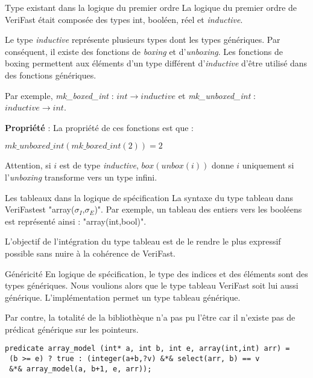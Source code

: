 \documentclass[9pt]{beamer}
\newcommand{\verifast}{VeriFast}
\newcommand{\inductive}{\textit{inductive}}
\begin{document}
\begin{frame}{Type existant dans la logique du premier ordre}
La logique du premier ordre de \verifast{} \'etait compos\'ee des types int, bool\'een, r\'eel et \inductive.

Le type \inductive{} repr\'esente plusieurs types dont les types g\'en\'eriques. Par cons\'equent, il existe des fonctions de \textit{boxing} et d'\textit{unboxing}. Les fonctions de boxing permettent aux \'el\'ements d'un type diff\'erent d'\inductive{} d'\^etre utilis\'e dans des fonctions g\'en\'eriques.

Par exemple, \textit{mk_boxed_int} : $int \rightarrow inductive$ et \textit{mk_unboxed_int} :  $inductive \rightarrow int$.

\textbf{Propri\'et\'e} : La propri\'et\'e de ces fonctions est que :
	\begin{center}
		$mk\_unboxed\_int(mk\_boxed\_int(2)) = 2$
	\end{center}
	Attention, si $i$ est de type \textit{inductive}, $box(unbox(i))$ donne $i$ uniquement si l'\textit{unboxing} transforme vers un type infini.
\end{frame}

\begin{frame}{Les tableaux dans la logique de sp\'ecification}
La syntaxe du type tableau dans \verifast est "array($\sigma_I$,$\sigma_E$)". Par exemple, un tableau des entiers vers les bool\'eens est repr\'esent\'e ainsi : "array(int,bool)".

L'objectif de l'int\'egration du type tableau est de le rendre le plus expressif possible sans nuire \`a la coh\'erence de \verifast.
\end{frame}

\begin{frame}[fragile]{G\'en\'ericit\'e}
	En logique de sp\'ecification, le type des indices et des \'el\'ements sont des types g\'en\'eriques. Nous voulions alors que le type tableau \verifast{} soit lui aussi g\'en\'erique. L'impl\'ementation permet un type tableau g\'en\'erique.
	
	Par contre, la totalit\'e de la biblioth\`eque n'a pas pu l'\^etre car il n'existe pas de pr\'edicat g\'en\'erique sur les pointeurs.
	\begin{lstlisting}[basicstyle=\footnotesize]
predicate array_model (int* a, int b, int e, array(int,int) arr) =
 (b >= e) ? true : (integer(a+b,?v) &*& select(arr, b) == v
 &*& array_model(a, b+1, e, arr));
	\end{lstlisting}
\end{frame}
\end{document}
